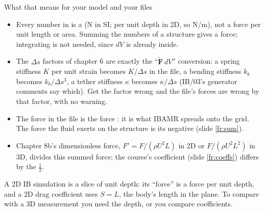 \documentclass[aspectratio=169,11pt]{beamer}
\begin{document}
\begin{frame}{What that means for your model and your files}
\label{fr:units}
\small
\begin{itemize}
  \item Every number in  is a  (N in SI; per unit depth in 2D, so N/m), not a force per unit length or area. Summing the numbers of a structure gives a force; integrating is not needed, since $dV$ is already inside.
  \item The $\Delta s$ factors of chapter 6 are exactly the ``$\tilde{\mathbf{F}}\,dV$'' conversion: a spring stiffness $K$ per unit strain becomes $K/\Delta s$ in the file, a bending stiffness $k_b$ becomes $k_b/\Delta s^3$, a tether stiffness $\kappa$ becomes $\kappa/\Delta s$ (IB/03's generator comments say which). Get the factor wrong and the file's forces are wrong by that factor, with no warning.
  \item The force in the file is the force : it is what IBAMR spreads onto the grid. The force the fluid exerts on the structure is its negative (slide \ref{fr:sum}).
  \item Chapter 8b's dimensionless force, $F' = F/(\rho U^2 L)$ in 2D or $F/(\rho U^2 L^2)$ in 3D, divides this summed force; the course's coefficient (slide \ref{fr:coeffs}) differs by the $\frac12$.
\end{itemize}
\begin{punchbox}
\footnotesize A 2D IB simulation is a slice of unit depth: its ``force'' is a force per unit depth, and a 2D drag coefficient uses $S = L$, the body's length in the plane. To compare with a 3D measurement you need the depth, or you compare coefficients.
\end{punchbox}
\end{frame}
\end{document}
